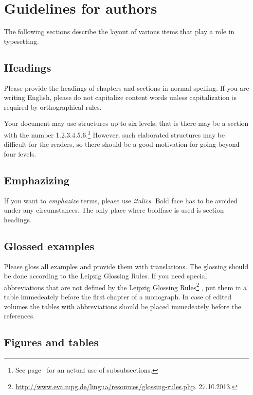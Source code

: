 \chapter{Guidelines for authors}

The following sections describe the layout of various items that play a role in typesetting. 

\section{Headings}

Please provide the headings of chapters and sections in normal spelling. If you are writing English,
please do not capitalize content words unless capitalization is required by orthographical rules. 

Your document may use structures up to six levels, that is there may be a section with
the number 1.2.3.4.5.6.\footnote{
  See page~\pageref{sec-Chinese} for an actual use of subsubsections.%
} However, such elaborated structures may be difficult for the readers, so
there should be a good motivation for going beyond four levels.


\section{Emphazizing}

If you want to \emph{emphazize} terms, please use \emph{italics}. Bold face has to be avoided under
any circumstances. The only place where boldfase is used is section headings.

\section{Glossed examples}

Please gloss all examples and provide them with translations. The glossing should be done according
to the Leipzig Glossing Rules. If you need special abbreviations that are not defined by the Leipzig
Glossing Rules\footnote{
\url{http://www.eva.mpg.de/lingua/resources/glossing-rules.php}. 27.10.2013.
}
, put them in a table immedeately before the first chapter of a
monograph. In case of edited volumes the tables with abbreviations should be placed immedeately
before the references.

\section{Figures and tables}

